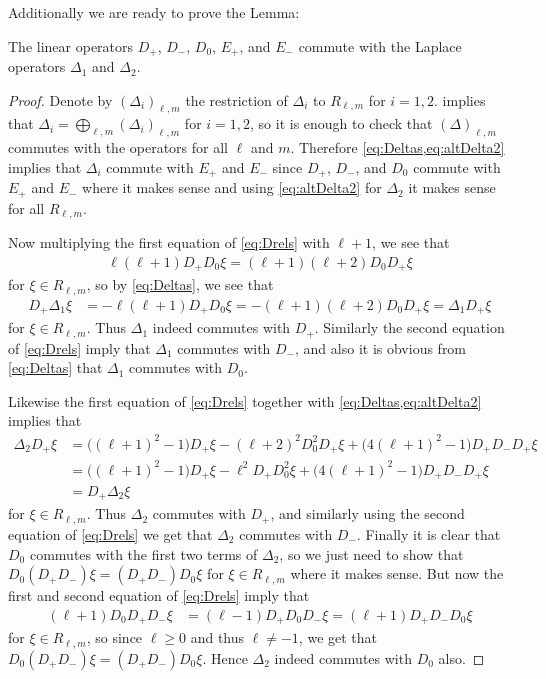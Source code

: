Additionally we are ready to prove the Lemma:
\begin{lemma}\label{lem:commuteDeltas}
  The linear operators $D_+$, $D_-$, $D_0$, $E_+$, and $E_-$ commute with the Laplace operators $\Delta_1$ and $\Delta_2$. 
\end{lemma}
\begin{proof}
  Denote by $(\Delta_i)_{\ell,m}$ the restriction of $\Delta_i$ to $R_{\ell,m}$ for $i=1,2$.  implies that $\Delta_i=\bigoplus_{\ell,m} (\Delta_i)_{\ell,m}$ for $i=1,2$, so it is enough to check that $(\Delta)_{\ell,m}$ commutes with the operators for all $\ell$ and $m$. Therefore \cref{eq:Deltas,eq:altDelta2} implies that $\Delta_i$ commute with $E_+$ and $E_-$ since $D_+$, $D_-$, and $D_0$ commute with $E_+$ and $E_-$ where it makes sense and using \cref{eq:altDelta2} for $\Delta_2$ it makes sense for all $R_{\ell,m}$.

  Now multiplying the first equation of \cref{eq:Drels} with $\ell+1$, we see that
  \begin{align*}
    \ell(\ell+1)D_+D_0\xi = (\ell+1)(\ell+2)D_0D_+ \xi
  \end{align*}
  for $\xi\in R_{\ell,m}$, so by \cref{eq:Deltas}, we see that
  \begin{align*}
    D_+\Delta_1 \xi &= -\ell(\ell+1)D_+D_0 \xi = -(\ell+1)(\ell+2)D_0D_+ \xi = \Delta_1 D_+ \xi
  \end{align*}
  for $\xi\in R_{\ell,m}$. Thus $\Delta_1$ indeed commutes with $D_+$. Similarly the second equation of \cref{eq:Drels} imply that $\Delta_1$ commutes with $D_-$, and also it is obvious from \cref{eq:Deltas} that $\Delta_1$ commutes with $D_0$.

  Likewise the first equation of \cref{eq:Drels} together with \cref{eq:Deltas,eq:altDelta2} implies that
  \begin{align*}
    \Delta_2 D_+ \xi &= \bigl((\ell+1)^2-1\bigr)D_+\xi - (\ell+2)^2D_0^2D_+\xi + \bigl(4(\ell+1)^2-1\bigr)D_+D_-D_+\xi \\
                     &= \bigl((\ell+1)^2-1\bigr)D_+\xi - \ell^2D_+D_0^2\xi + \bigl(4(\ell+1)^2-1\bigr)D_+D_-D_+\xi \\
                     &= D_+\Delta_2 \xi
  \end{align*}
  for $\xi\in R_{\ell,m}$. Thus $\Delta_2$ commutes with $D_+$, and similarly using the second equation of \cref{eq:Drels} we get that $\Delta_2$ commutes with $D_-$. Finally it is clear that $D_0$ commutes with the first two terms of $\Delta_2$, so we just need to show that $D_0(D_+D_-)\xi=(D_+D_-)D_0\xi$ for $\xi\in R_{\ell,m}$ where it makes sense. But now the first and second equation of \cref{eq:Drels} imply that
  \begin{align*}
    (\ell+1)D_0D_+D_-\xi &= (\ell-1)D_+D_0D_-\xi = (\ell+1) D_+D_-D_0\xi
  \end{align*}
  for $\xi\in R_{\ell,m}$, so since $\ell\geq 0$ and thus $\ell\neq -1$, we get that $D_0(D_+D_-)\xi=(D_+D_-)D_0\xi$. Hence $\Delta_2$ indeed commutes with $D_0$ also.
\end{proof}

